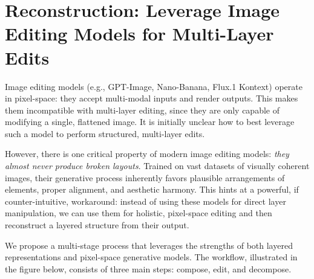 \documentclass{article}
\begin{document}
\section{Reconstruction: Leverage Image Editing Models for Multi-Layer Edits}
\label{section:reconstruction}
Image editing models (e.g., GPT-Image, Nano-Banana, Flux.1 Kontext) operate in pixel-space: they accept multi-modal inputs and render outputs. This makes them incompatible with multi-layer editing, since they are only capable of modifying a single, flattened image. It is initially unclear how to best leverage such a model to perform structured, multi-layer edits.

However, there is one critical property of modern image editing models: \textit{they almost never produce broken layouts}. Trained on vast datasets of visually coherent images, their generative process inherently favors plausible arrangements of elements, proper alignment, and aesthetic harmony. This hints at a powerful, if counter-intuitive, workaround: instead of using these models for direct layer manipulation, we can use them for holistic, pixel-space editing and then reconstruct a layered structure from their output.

We propose a multi-stage process that leverages the strengths of both layered representations and pixel-space generative models. The workflow, illustrated in the figure below, consists of three main steps: compose, edit, and decompose.
\end{document}
